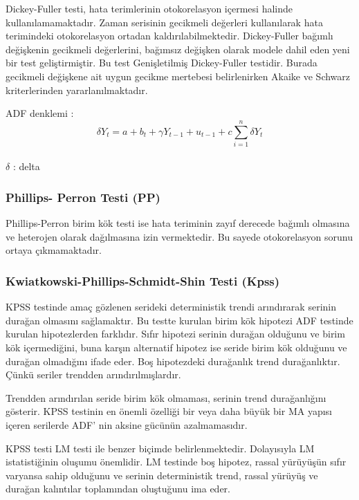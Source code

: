 \documentclass[11pt]{article}
\begin{document}
Dickey-Fuller testi, hata terimlerinin otokorelasyon içermesi halinde
kullanılamamaktadır. Zaman serisinin gecikmeli değerleri kullanılarak
hata terimindeki otokorelasyon ortadan kaldırılabilmektedir.
Dickey-Fuller bağımlı değişkenin gecikmeli değerlerini, bağımsız
değişken olarak modele dahil eden yeni bir test geliştirmiştir. Bu test
Genişletilmiş Dickey-Fuller testidir. Burada gecikmeli değişkene ait
uygun gecikme mertebesi belirlenirken Akaike ve Schwarz kriterlerinden
yararlanılmaktadır.

ADF denklemi :
\[\delta Y_{t}= a+ b_{t}+\gamma Y_{t-1}+ u_{t-1} +c\sum_{i=1}^n  \delta Y_{t} \]\\
\(\delta\) : delta

\subsubsection{Phillips- Perron Testi
(PP)}\label{phillips--perron-testi-pp}

Phillips-Perron birim kök testi ise hata teriminin zayıf derecede
bağımlı olmasına ve heterojen olarak dağılmasına izin vermektedir. Bu
sayede otokorelasyon sorunu ortaya çıkmamaktadır.

\subsubsection{Kwiatkowski-Phillips-Schmidt-Shin Testi
(Kpss)}\label{kwiatkowski-phillips-schmidt-shin-testi-kpss}

KPSS testinde amaç gözlenen serideki deterministik trendi arındırarak
serinin durağan olmasını sağlamaktır. Bu testte kurulan birim kök
hipotezi ADF testinde kurulan hipotezlerden farklıdır. Sıfır hipotezi
serinin durağan olduğunu ve birim kök içermediğini, buna karşın
alternatif hipotez ise seride birim kök olduğunu ve durağan olmadığını
ifade eder. Boş hipotezdeki durağanlık trend durağanlıktır. Çünkü
seriler trendden arındırılmışlardır.

Trendden arındırılan seride birim kök olmaması, serinin trend
durağanlığını gösterir. KPSS testinin en önemli özelliği bir veya daha
büyük bir MA yapısı içeren serilerde ADF' nin aksine gücünün
azalmamasıdır.

KPSS testi LM testi ile benzer biçimde belirlenmektedir. Dolayısıyla LM
istatistiğinin oluşumu önemlidir. LM testinde boş hipotez, rassal
yürüyüşün sıfır varyansa sahip olduğunu ve serinin deterministik trend,
rassal yürüyüş ve durağan kalıntılar toplamından oluştuğunu ima eder.
\end{document}
